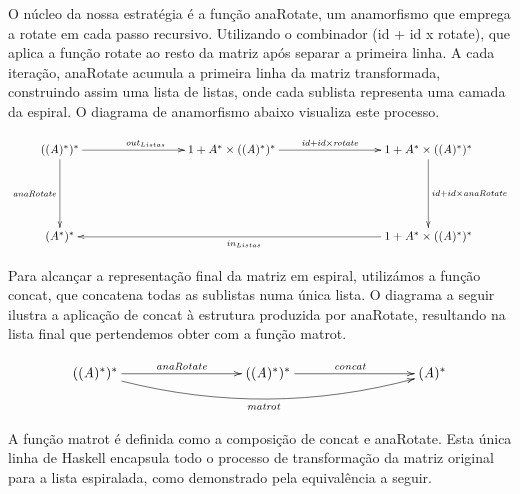 \documentclass[11pt, a4paper, fleqn]{article}
\newcommand{\Conid}[1]{\mathit{#1}}
\newcommand{\Varid}[1]{\mathit{#1}}
\def\resethooks{%
  \global\let\SaveRestoreHook\empty
  \global\let\ColumnHook\empty}
\let\hspre\empty
\let\hspost\empty
\begin{document}
     O núcleo da nossa estratégia é a função anaRotate, um anamorfismo que emprega a rotate 
em cada passo recursivo. Utilizando o combinador (id + id x rotate), que aplica a função 
rotate ao resto da matriz após separar a primeira linha. A cada iteração, anaRotate acumula 
a primeira linha da matriz transformada, construindo assim uma lista de listas, onde 
cada sublista representa uma camada da espiral.
O diagrama de anamorfismo abaixo visualiza este processo.

\begin{eqnarray*}
\xymatrix@C=3cm @R=2cm{
     \mathbb{((\ensuremath{\Conid{A}})^*)^*}\ar[r]^{out_{Listas}}\ar[d]_{\ensuremath{\Varid{anaRotate}}} & 1 + A^* \times{\mathbb{((\ensuremath{\Conid{A}})^*)^*}}\ar[r]^{id + id \times{\mathbb{\ensuremath{\Varid{rotate}}}} } & 1 + A^* \times{\mathbb{((\ensuremath{\Conid{A}})^*)^*}}\ar[d]^{id +id \times{\ensuremath{\Varid{anaRotate}}}} \\
     (A^*)^* && 1 + A^* \times{\mathbb{((\ensuremath{\Conid{A}})^*)^*}}\ar[ll]^{ in_{Listas}} 
 }
\end{eqnarray*}

\resethooks

Para alcançar a representação final da matriz em espiral, utilizámos a função concat, 
que concatena todas as sublistas numa única lista. O diagrama a seguir ilustra a 
aplicação de concat à estrutura produzida por anaRotate, resultando na lista 
final que pertendemos obter com a função matrot.

\begin{eqnarray*}
\xymatrix@C=3cm @R=2cm{
     ((\ensuremath{\Conid{A}})^*)^*\ar@/_1.5pc/[rr]_{\ensuremath{\Varid{matrot}}}\ar[r]^(0.50){\ensuremath{\Varid{anaRotate}}} & ((\ensuremath{\Conid{A}})^*)^*\ar[r]^(0.50){\ensuremath{\Varid{concat}}} & (\ensuremath{\Conid{A}})^*
}
\end{eqnarray*}

A função matrot é definida como a composição de concat e anaRotate. Esta única linha de 
Haskell encapsula todo o processo de transformação da matriz original para a lista espiralada, 
como demonstrado pela equivalência a seguir.
\end{document}
